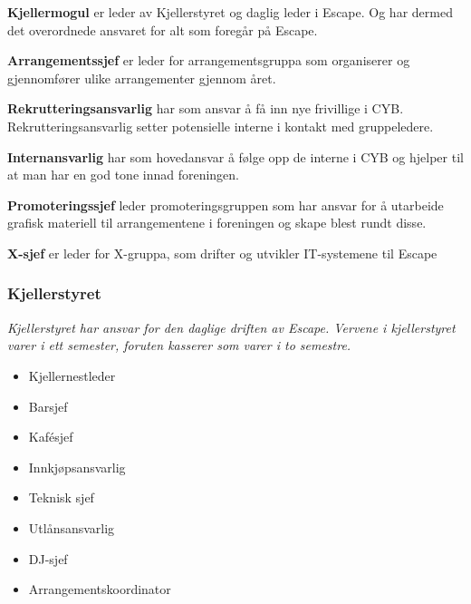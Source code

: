 \documentclass[12pt, norsk, a4paper]{proc}
\providecommand{\tightlist}{%
  \setlength{\itemsep}{0pt}\setlength{\parskip}{0pt}}
\begin{document}



\textbf{Kjellermogul} er leder av Kjellerstyret og daglig leder i Escape. Og har dermed det overordnede ansvaret for alt som foregår på Escape.


\textbf{Arrangementssjef} er leder for arrangementsgruppa som organiserer og gjennomfører ulike arrangementer gjennom året.

\textbf{Rekrutteringsansvarlig} har som ansvar å få inn nye frivillige i CYB. Rekrutteringsansvarlig setter potensielle interne i kontakt med gruppeledere.

\textbf{Internansvarlig} har som hovedansvar å følge opp de interne i CYB og hjelper til at man har en god tone innad foreningen.

\textbf{Promoteringssjef} leder promoteringsgruppen som har ansvar for å utarbeide grafisk materiell til arrangementene i foreningen og skape blest rundt disse.

\textbf{X-sjef} er leder for X-gruppa, som drifter og utvikler IT-systemene til Escape



\hypertarget{kjellerstyret}{%
\subsubsection*{Kjellerstyret}\label{kjellerstyret}}

\emph{Kjellerstyret har ansvar for den daglige driften av Escape.
Vervene i kjellerstyret varer i ett semester, foruten kasserer
som varer i to semestre.}

\begin{itemize}
\tightlist
\item
    Kjellernestleder
\item
    Barsjef
\item
    Kafésjef
\item
    Innkjøpsansvarlig
\item
    Teknisk sjef
\item
    Utlånsansvarlig
\item
    DJ-sjef
\item
    Arrangementskoordinator
\end{itemize}
\end{document}
